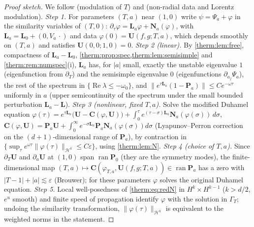 \begin{proof}[Proof sketch]
We follow \cite{DonningerSchoerkhuber2012,DonningerSchoerkhuber2014} (modulation of
$T$) and \cite{DonningerSchoerkhuber2017,Ostermann2024} (non-radial data and Lorentz
modulation).
\emph{Step 1.} For parameters $(T,a)$ near $(1,0)$ write $\psi=\Psi_a+\varphi$ in the
similarity variables of $(T,0)$: $\partial_\tau\varphi=\mathbf L_a\varphi+\mathbf N_a(\varphi)$, with
$\mathbf L_a=\mathbf L_0+(0,V_a\,\cdot)$ and data $\varphi(0)=\mathbf U(f,g;T,a)$, which depends
smoothly on $(T,a)$ and satisfies $\mathbf U(0,0;1,0)=0$.
\emph{Step 2 (linear).} By \cref{therm:lem:free}, compactness of $\mathbf L_a-\mathbf L_0$,
\cref{therm:prop:spec,therm:lem:semisimple} and \cref{therm:rem:numspec}(i),
$\mathbf L_a$ has, for $|a|$ small, exactly the unstable eigenvalue $1$ (eigenfunction
from $\partial_T$) and the semisimple eigenvalue $0$ (eigenfunctions $\partial_{a_j}\Psi_a$),
the rest of the spectrum in $\{\operatorname{Re}\lambda\le-\omega_0\}$, and
$\|e^{\tau\mathbf L_a}(1-\mathbf P_a)\|\le Ce^{-\omega\tau}$ uniformly in $a$ (upper semicontinuity of the
spectrum under the small bounded perturbation $\mathbf L_a-\mathbf L$).
\emph{Step 3 (nonlinear, fixed $T,a$).} Solve the modified Duhamel equation
$\varphi(\tau)=e^{\tau\mathbf L_a}\bigl(\mathbf U-\mathbf C(\varphi,\mathbf U)\bigr)+\int_0^\tau e^{(\tau-\sigma)\mathbf L_a}\mathbf N_a(\varphi(\sigma))\,d\sigma$,
$\mathbf C(\varphi,\mathbf U)=\mathbf P_a\mathbf U+\int_0^\infty e^{-\sigma\mathbf L_a}\mathbf P_a\mathbf N_a(\varphi(\sigma))d\sigma$ (Lyapunov--Perron
correction on the $(d+1)$-dimensional range of $\mathbf P_a$), by contraction in
$\{\sup_\tau e^{\omega\tau}\|\varphi(\tau)\|_{\mathcal H^k}\le C\varepsilon\}$, using \cref{therm:lem:N}.
\emph{Step 4 (choice of $T,a$).} Since $\partial_T\mathbf U$ and $\partial_{a}\mathbf U$ at
$(1,0)$ span $\operatorname{ran}\mathbf P_0$ (they are the symmetry modes), the finite-dimensional map
$(T,a)\mapsto\mathbf C(\varphi_{T,a},\mathbf U(f,g;T,a))\in\operatorname{ran}\mathbf P_a$ has a zero with $|T-1|+|a|\lesssim\varepsilon$
(Brouwer); for these parameters $\varphi$ solves the original Duhamel equation.
\emph{Step 5.} Local well-posedness of \cref{therm:eq:redN} in $H^k\times H^{k-1}$
($k>d/2$, $e^u$ smooth) and finite speed of propagation identify $\varphi$ with the
solution in $\Gamma_T$; undoing the similarity transformation, $\|\varphi(\tau)\|_{\mathcal H^k}$
is equivalent to the weighted norms in the statement.
\end{proof}

